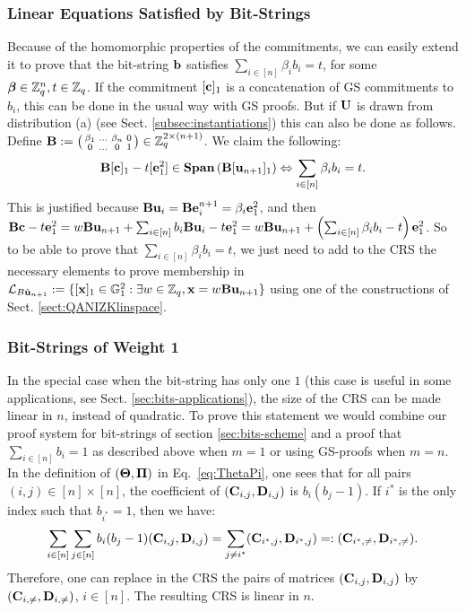 \subsubsection{Linear Equations Satisfied by Bit-Strings}\label{sec:linear-eqs-bitstrings}
Because of the homomorphic properties of the commitments, 
we can easily extend it to prove that the bit-string $ \mathbf{b}$ satisfies $\sum_{i \in [n]} \beta_i b_i=t$, for some ${\boldsymbol \beta} \in \mathbb{Z}_q^{n}, t\in \mathbb{Z}_q$. 
If the commitment $[\mathbf{c}]_1$ is a concatenation of GS commitments to $b_i$, this can be done in the usual way with GS proofs. 
But if $\mathbf{{U}}$ is drawn from distribution (a) (see Sect. \ref{subsec:instantiations})
this can also be done as follows. 
Define $\mathbf{{B}}:=\left(\begin{smallmatrix} \beta_1 & \ldots & \beta_n & 0\\ 0 & \ldots & 0 &1\end{smallmatrix}\right)
\in \mathbb{Z}_q^{2\times (n+1)}$. %
We claim the following:
$$\mathbf{{B}}[\mathbf{c}]_1- t [\mathbf{e}^{2}_{1}] \in \mathbf{Span}\left(\mathbf{{B}}[\mathbf{u}_{n+1}]_1\right) \Leftrightarrow \sum_{i \in [n]}\beta_i  b_i=t.$$
This is justified because
$\mathbf{{B}}\mathbf{u}_i = \mathbf{{B}}\mathbf{e}^{n+1}_i=\beta_i\mathbf{e}_1^{2}$, and then
$ \mathbf{{B}}\mathbf{c}- t \mathbf{e}^{2}_{1}=w  \mathbf{{B}} \mathbf{u}_{n+1}+ \sum_{i \in [n]} b_i \mathbf{{B}} \mathbf{u}_{i} - t \mathbf{e}^{2}_1=w\mathbf{{B}}\mathbf{u}_{n+1}+\left(\sum_{i\in[n]}\beta_i b_i-t\right)\mathbf{e}_1^2$.
So to be able to prove that $\sum_{i \in [n]} \beta_i b_i=t$, we just need to add to the CRS the necessary elements to prove membership 
in $\mathcal{L}_{B\hat{\mathbf{u}}_{n+1}}:=\{ [\mathbf{x}]_1 \in \mathbb{G}_1^2: \exists w \in \mathbb{Z}_q,  \mathbf{x} = w\mathbf{{B}}\mathbf{u}_{n+1} \}$ using one of the constructions of Sect. 
\ref{sect:QANIZKlinspace}.

\subsubsection{Bit-Strings of Weight 1}  In the special
case when the bit-string has only one $1$ (this case is useful in some applications, see Sect. \ref{sec:bits-applications}),  the size of the CRS can be made linear in $n$, instead of quadratic.
To prove this statement we would combine our proof system for bit-strings of section \ref{sec:bits-scheme} and a proof that  $\sum_{i \in [n]} b_i=1$ as described above
when $m=1$ or using GS-proofs when $m=n$.
In the definition of $(\mathbf{{\Theta}},\mathbf{{\Pi}})$ in Eq.~\ref{eq:ThetaPi}, one 
sees that for all pairs $(i,j) \in [n] \times [n]$, the coefficient of $(\mathbf{C}_{i,j},\mathbf{D}_{i,j})$ is $b_i(b_j-1)$.
If $i^*$ is the only index such that $b_{i^*}=1$, then we have:
$$\sum_{i \in [n]} \sum_{j \in [n]} b_i(b_j-1) (\mathbf{C}_{i,j},\mathbf{D}_{i,j}) = \sum_{j \neq i^*} (\mathbf{C}_{i^*,j},\mathbf{D}_{i^*,j})=: (\mathbf{C}_{i^*,\neq},\mathbf{D}_{i^*,\neq}).$$
Therefore, one can replace in the CRS the pairs of matrices  $ (\mathbf{C}_{i,j},\mathbf{D}_{i,j})$ by  $(\mathbf{C}_{i,\neq},\mathbf{D}_{i,\neq})$, $i \in [n]$. The resulting CRS is linear in $n$.

